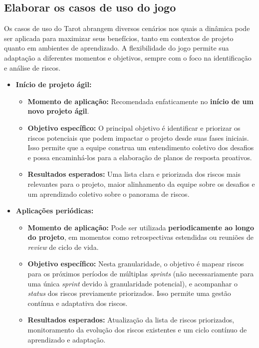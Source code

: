 \documentclass[
	12pt,
	openright,
	twoside,
	a4paper,
	english,
	brazil
	]{abntex2}
\begin{document}
\subsection{Elaborar os casos de uso do jogo}
\label{sec:casos-de-uso}

Os casos de uso do Tarot abrangem diversos cenários nos quais a dinâmica pode ser aplicada para maximizar seus benefícios, tanto em contextos de projeto quanto em ambientes de aprendizado. A flexibilidade do jogo permite sua adaptação a diferentes momentos e objetivos, sempre com o foco na identificação e análise de riscos.

\begin{itemize}
\item \textbf{Início de projeto ágil:}
\begin{itemize}
\item \textbf{Momento de aplicação:} Recomendada enfaticamente no \textbf{início de um novo projeto ágil}. 
\item \textbf{Objetivo específico:} O principal objetivo é identificar e priorizar os riscos potenciais que podem impactar o projeto desde suas fases iniciais. Isso permite que a equipe construa um entendimento coletivo dos desafios e possa encaminhá-los para a elaboração de planos de resposta proativos. 
\item \textbf{Resultados esperados:} Uma lista clara e priorizada dos riscos mais relevantes para o projeto, maior alinhamento da equipe sobre os desafios e um aprendizado coletivo sobre o panorama de riscos. 
\end{itemize}
\item \textbf{Aplicações periódicas:}
\begin{itemize}
\item \textbf{Momento de aplicação:} Pode ser utilizada \textbf{periodicamente ao longo do projeto}, em momentos como retrospectivas estendidas ou reuniões de \textit{review} de ciclo de vida. 
\item \textbf{Objetivo específico:} Nesta granularidade, o objetivo é mapear riscos para os próximos períodos de múltiplas \textit{sprints} (não necessariamente para uma única \textit{sprint} devido à granularidade potencial), e acompanhar o \textit{status} dos riscos previamente priorizados. Isso permite uma gestão contínua e adaptativa dos riscos.
\item \textbf{Resultados esperados:} Atualização da lista de riscos priorizados, monitoramento da evolução dos riscos existentes e um ciclo contínuo de aprendizado e adaptação. 

\end{itemize}
\end{itemize}
\end{document}
